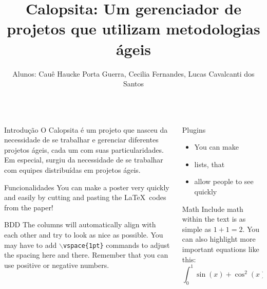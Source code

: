 \documentclass[serif,mathserif,final]{beamer}
\title{Calopsita: Um gerenciador de projetos que utilizam metodologias ágeis}
\author{Alunos: Cauê Haucke Porta Guerra, Cecilia Fernandes, Lucas Cavalcanti dos Santos}
\newcommand{\calopsita}{Calopsita}
\begin{document}
\begin{frame}{}
  \begin{columns}[t]

    \begin{column}{0.32\linewidth}

      \begin{block}{Introdução}
        O \calopsita{} é um projeto que nasceu da necessidade de se trabalhar e gerenciar diferentes projetos ágeis, cada um com suas particularidades. Em especial, surgiu da necessidade de se trabalhar com equipes distribuídas em projetos ágeis. 
      \end{block}

      \begin{block}{Funcionalidades}
        You can make a poster very quickly and easily by cutting and pasting
        the \LaTeX~codes from the paper!
      \end{block}

      \begin{block}{BDD}
        The columns will automatically align with each other and try to look
        as nice as possible.  You may have to add {\tt$\backslash$vspace\{1pt\}}
        commands to adjust the spacing here and there.  Remember that you can
        use positive or negative numbers.
      \end{block}

    \end{column}%

    \begin{column}{0.32\linewidth}

      \begin{block}{Plugins}
        \begin{itemize}
          \item You can make
          \item lists, that
          \item allow people to see quickly
        \end{itemize}
      \end{block}

      \begin{block}{Math}
        Include math within the text is as simple as $1+1=2$.  You can also
        highlight more important equations like this:
        \begin{equation*}
          \int_0^1\sin(x)+\cos^2(x)+\alpha x~d\!x
        \end{equation*}
      \end{block}


\end{column}
\end{columns}
\end{frame}
\end{document}

